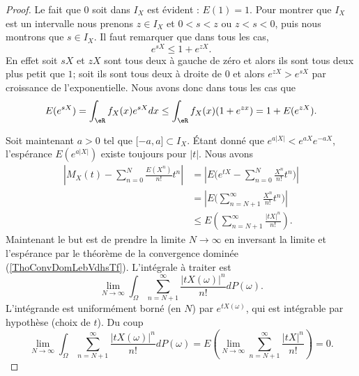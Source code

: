 \begin{proof}
	Le fait que \( 0\) soit dans \( I_X\) est évident : \( E(1)=1\). Pour montrer que \( I_X\) est un intervalle nous prenons \( z\in I_X\) et \( 0<s<z\) ou \( z<s<0\), puis nous montrons que \( s\in I_X\). Il faut remarquer que dans tous les cas,
	\begin{equation}
		e^{sX}\leq 1+ e^{zX}.
	\end{equation}
	En effet soit \( sX\) et \( zX\) sont tous deux à gauche de zéro et alors ils sont tous deux plus petit que \( 1\); soit ils sont tous deux à droite de \( 0\) et alors \( e^{zX}> e^{sX}\) par croissance de l'exponentielle. Nous avons donc dans tous les cas que
	\begin{equation}
		E( e^{sX})=\int_{\eR}f_X(x) e^{sX}dx\leq \int_{\eR}f_X(x)(1+ e^{zx})=1+E( e^{zX}).
	\end{equation}

	Soit maintenant \( a>0\) tel que \( \mathopen[ -a , a \mathclose]\subset I_X\). Étant donné que \(  e^{a| X |}< e^{aX} e^{-aX}\), l'espérance \( E( e^{a| X |})\) existe toujours pour \( | t |\). Nous avons
	\begin{subequations}
		\begin{align}
			\left| M_X(t)-\sum_{n=0}^N\frac{ E(X^n) }{ n! }t^n \right| & =\left| E\Big(  e^{tX}-\sum_{n=0}^N\frac{ X^n }{ n! }t^n \Big) \right|  \\
			                                                           & =\left| E\Big( \sum_{n=N+1}^{\infty}\frac{ X^n }{ n! }t^n \Big) \right| \\
			                                                           & \leq E\left( \sum_{n=N+1}^{\infty}\frac{ | tX |^n }{ n! } \right).
		\end{align}
	\end{subequations}
	Maintenant le but est de prendre la limite \( N\to\infty\) en inversant la limite et l'espérance par le théorème de la convergence dominée (\ref{ThoConvDomLebVdhsTf}). L'intégrale à traiter est
	\begin{equation}
		\lim_{N\to \infty} \int_{\Omega}\sum_{n=N+1}^{\infty}\frac{ | tX(\omega) |^n }{ n! }dP(\omega).
	\end{equation}
	L'intégrande est uniformément borné (en \( N\)) par \(  e^{tX(\omega)}\), qui est intégrable par hypothèse (choix de \( t\)). Du coup
	\begin{equation}
		\lim_{N\to \infty} \int_{\Omega}\sum_{n=N+1}^{\infty}\frac{ | tX(\omega) |^n }{ n! }dP(\omega)=E\left( \lim_{N\to \infty} \sum_{n=N+1}^{\infty}\frac{ | tX |^n }{ n! } \right)=0.
	\end{equation}
\end{proof}


